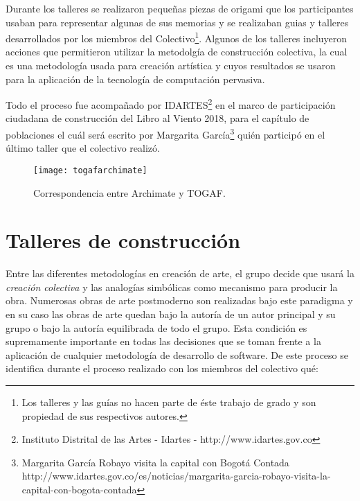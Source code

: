 Durante los talleres se realizaron pequeñas piezas de origami que los participantes usaban para representar algunas de sus memorias y se realizaban guias y talleres desarrollados por los miembros del Colectivo\footnote{Los talleres y las guías no hacen parte de éste trabajo de grado y son propiedad de sus respectivos autores.}. Algunos de los talleres incluyeron acciones que permitieron utilizar la metodolgía de construcción colectiva, la cual es una metodología usada para creación artística y cuyos resultados se usaron para la aplicación de la tecnología de computación pervasiva.

Todo el proceso fue acompañado por IDARTES\footnote{Instituto Distrital de las Artes - Idartes - http://www.idartes.gov.co} en el marco de participación ciudadana de construcción del Libro al Viento 2018, para el capítulo de poblaciones el cuál será escrito por Margarita García\cite{idartesmargarita}\footnote{Margarita García Robayo visita la capital con Bogotá Contada http://www.idartes.gov.co/es/noticias/margarita-garcia-robayo-visita-la-capital-con-bogota-contada} quién participó en el último taller que el colectivo realizó.

\begin{figure}[h]\label{togafarchimate}
\centering
\texttt{[image: togafarchimate]}
\caption{Correspondencia entre Archimate y TOGAF.}
\end{figure}

\section{Talleres de construcción}

Entre las diferentes metodologías en creación de arte, el grupo decide que usará la \textit{creación colectiva}\cite{casacuberta2003creacion} y las analogías simbólicas\cite{garcia2003idea} como mecanismo para producir la obra. Numerosas obras de arte postmoderno son realizadas bajo este paradigma y en su caso las obras de arte quedan bajo la autoría de un autor principal y su grupo o bajo la autoría equilibrada de todo el grupo. Esta condición es supremamente importante en todas las decisiones que se toman frente a la aplicación de cualquier metodología de desarrollo de software. De este proceso se identifica durante el proceso realizado con los miembros del colectivo qué: 

